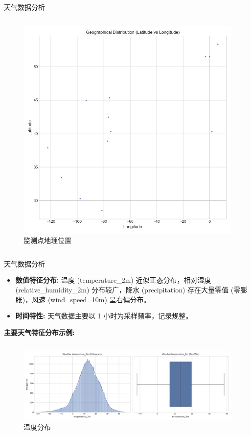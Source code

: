 \documentclass{beamer} %
\begin{document}
\begin{frame}{天气数据分析}
\begin{columns}
\begin{column}{0.3\textwidth}
\begin{figure}
                \includegraphics[width=\textwidth]{../plots/metadata_location_scatter.png}
                \caption{监测点地理位置}
            \end{figure}
        \end{column}
    \end{columns}
\end{frame}

\begin{frame}{天气数据分析}
    \begin{itemize}
        \item \textbf{数值特征分布:} 温度 (temperature\_2m) 近似正态分布，相对湿度 (relative\_humidity\_2m) 分布较广，降水 (precipitation) 存在大量零值 (零膨胀)，风速 (wind\_speed\_10m) 呈右偏分布。
        \item \textbf{时间特性:} 天气数据主要以 1 小时为采样频率，记录规整。
    \end{itemize}
    \textbf{主要天气特征分布示例:}
    \begin{columns}
        \begin{column}{0.95\textwidth}
            \centering
            \begin{figure}
                \includegraphics[width=\textwidth]{../plots/weather_distribution_temperature_2m.png}
                \caption{温度分布}
            \end{figure}
        \end{column}
    \end{columns}
\end{frame}
\end{document}
